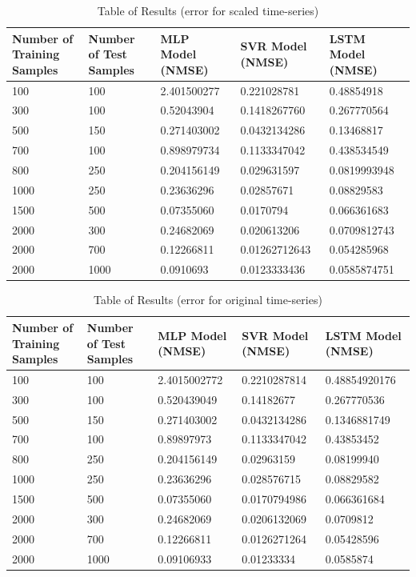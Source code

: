 \documentclass{article}
\begin{document}
\begin{table}[htb!]
	\centering
	\begin{tabular}{p{2cm} p{2cm} p{2cm} p{2cm} p{2cm}}
		\toprule
		Number of Training Samples & Number of Test Samples & MLP Model (NMSE) & SVR Model (NMSE) & LSTM Model (NMSE) \\
		\midrule
		100 & 100 & 2.401500277 & 0.221028781 & 0.48854918 \\
		\midrule
		300 & 100 & 0.52043904 & 0.1418267760 & 0.267770564 \\
		\midrule
		500 & 150 & 0.271403002 & 0.0432134286 & 0.13468817 \\
		\midrule
		700 & 100 & 0.898979734 & 0.1133347042 & 0.438534549 \\
		\midrule
		800 & 250 & 0.204156149 & 0.029631597 & 0.0819993948 \\
		\midrule
		1000 & 250 & 0.23636296 & 0.02857671 & 0.08829583 \\
		\midrule
		1500 & 500 & 0.07355060 & 0.0170794 & 0.066361683 \\
		\midrule
		2000 & 300 & 0.24682069 & 0.020613206 & 0.0709812743 \\
		\midrule
		2000 & 700 & 0.12266811 & 0.01262712643 & 0.054285968 \\
		\midrule
		2000 & 1000 & 0.0910693 &  0.0123333436 & 0.0585874751 \\
		\bottomrule
	\end{tabular}
	\caption{Table of Results (error for scaled time-series)}
\end{table}

\begin{table}[htb!]
	\centering
	\begin{tabular}{p{2cm} p{2cm} p{2cm} p{2cm} p{2cm}}
		\toprule
		Number of Training Samples & Number of Test Samples & MLP Model (NMSE) & SVR Model (NMSE) & LSTM Model (NMSE) \\
		\midrule
		100 & 100 & 2.4015002772 & 0.2210287814 & 0.48854920176 \\
		\midrule
		300 & 100 & 0.520439049 & 0.14182677 & 0.267770536 \\ 
		\midrule
		500 & 150 & 0.271403002 & 0.0432134286 & 0.1346881749 \\
		\midrule
		700 & 100 & 0.89897973 & 0.1133347042 & 0.43853452 \\
		\midrule
		800 & 250 & 0.204156149 & 0.02963159 & 0.08199940 \\
		\midrule
		1000 & 250 & 0.23636296  & 0.028576715 & 0.08829582 \\
		\midrule
		1500 & 500 & 0.07355060 & 0.0170794986 & 0.066361684 \\
		\midrule
		2000 & 300 & 0.24682069 & 0.0206132069 & 0.0709812 \\
		\midrule
		2000 & 700 & 0.12266811 & 0.0126271264 & 0.05428596 \\
		\midrule
		2000 & 1000 & 0.09106933 & 0.01233334 & 0.0585874 \\
		\bottomrule
	\end{tabular} \caption{Table of Results (error for original time-series)}
\end{table}
\end{document}
